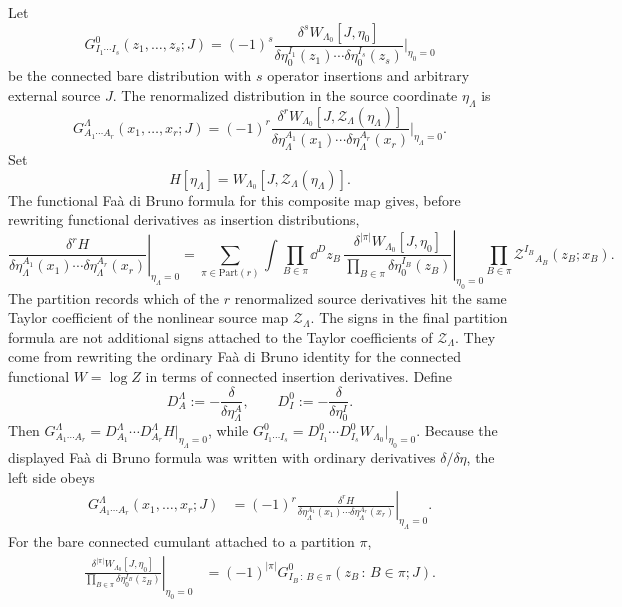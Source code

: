 Let
\[
  G^0_{I_1\cdots I_s}(z_1,\ldots,z_s;J)
  =
  (-1)^s
  \frac{\delta^s W_{\Lambda_0}[J,\eta_0]}
       {\delta\eta_0^{I_1}(z_1)\cdots
        \delta\eta_0^{I_s}(z_s)}
  \bigg|_{\eta_0=0}
\]
be the connected bare distribution with \(s\) operator insertions and
arbitrary external source \(J\).  The renormalized distribution in the source
coordinate \(\eta_\Lambda\) is
\[
  G^\Lambda_{A_1\cdots A_r}(x_1,\ldots,x_r;J)
  =
  (-1)^r
  \frac{\delta^r W_{\Lambda_0}[J,\mathcal Z_\Lambda(\eta_\Lambda)]}
       {\delta\eta_\Lambda^{A_1}(x_1)\cdots
        \delta\eta_\Lambda^{A_r}(x_r)}
  \bigg|_{\eta_\Lambda=0}.
\]
Set
\[
  H[\eta_\Lambda]=
  W_{\Lambda_0}[J,\mathcal Z_\Lambda(\eta_\Lambda)] .
\]
The functional Fa\`a di Bruno formula for this composite map gives, before
rewriting functional derivatives as insertion distributions,
\[
  \left.
  \frac{\delta^r H}
       {\delta\eta_\Lambda^{A_1}(x_1)\cdots
        \delta\eta_\Lambda^{A_r}(x_r)}
  \right|_{\eta_\Lambda=0}
  =
  \sum_{\pi\in\mathrm{Part}(r)}
  \int\prod_{B\in\pi}\dd^D z_B\,
  \left.
  \frac{\delta^{|\pi|}W_{\Lambda_0}[J,\eta_0]}
       {\prod_{B\in\pi}\delta\eta_0^{I_B}(z_B)}
  \right|_{\eta_0=0}
  \prod_{B\in\pi}
  \mathcal Z^{I_B}{}_{A_B}
    (z_B;x_B).
\]
The partition records which of the \(r\) renormalized source derivatives hit
the same Taylor coefficient of the nonlinear source map
\(\mathcal Z_\Lambda\).  The signs in the final partition formula are not
additional signs attached to the Taylor coefficients of \(\mathcal Z_\Lambda\).
They come from rewriting the ordinary Fa\`a di Bruno identity for the connected
functional \(W=\log Z\) in terms of connected insertion derivatives.  Define
\[
  D^\Lambda_A:=-\frac{\delta}{\delta\eta_\Lambda^A},
  \qquad
  D^0_I:=-\frac{\delta}{\delta\eta_0^I}.
\]
Then \(G^\Lambda_{A_1\cdots A_r}=D^\Lambda_{A_1}\cdots
D^\Lambda_{A_r}H|_{\eta_\Lambda=0}\), while
\(G^0_{I_1\cdots I_s}=D^0_{I_1}\cdots D^0_{I_s}
W_{\Lambda_0}|_{\eta_0=0}\).  Because the displayed Fa\`a di Bruno formula was
written with ordinary derivatives \(\delta/\delta\eta\), the left side obeys
\[
  \begin{aligned}
  G^\Lambda_{A_1\cdots A_r}(x_1,\ldots,x_r;J)
  &=
  (-1)^r
  \left.
  \frac{\delta^r H}
       {\delta\eta_\Lambda^{A_1}(x_1)\cdots
        \delta\eta_\Lambda^{A_r}(x_r)}
  \right|_{\eta_\Lambda=0}.
  \end{aligned}
\]
For the bare connected cumulant attached to a partition \(\pi\),
\[
  \begin{aligned}
  \left.
  \frac{\delta^{|\pi|}W_{\Lambda_0}[J,\eta_0]}
       {\prod_{B\in\pi}\delta\eta_0^{I_B}(z_B)}
  \right|_{\eta_0=0}
  &=
  (-1)^{|\pi|}
  G^0_{I_B\,:\,B\in\pi}(z_B\,:\,B\in\pi;J).
  \end{aligned}
\]
